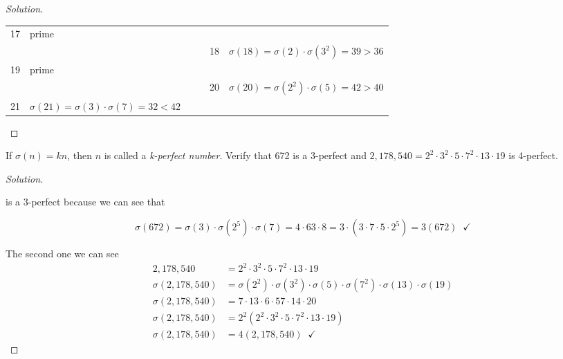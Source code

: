 \documentclass[11pt]{article}
\newenvironment{problem}[2][Problem]{\begin{trivlist}
\item[\hskip \labelsep {\bfseries #1}\hskip \labelsep {\bfseries #2.}]}{\end{trivlist}}
\newenvironment{solution}
  {\renewcommand\qedsymbol{$~$}\begin{proof}[Solution]$ $\par\nobreak\ignorespaces}
  {\end{proof}}
\begin{document}
\begin{solution}
{\begin{tabular}{l|l||l|l||l|l}
      17                                       & prime                                       &                                       &                                                &    &                                               \\
                                               & \                                           &                                       &                                                & 18 & $\sigma(18)=\sigma(2)\cdot \sigma(3^2)=39>36$ \\
      19                                       & prime                                       &                                       &                                                &    &                                               \\
                                               &                                             &                                       &                                                & 20 & $\sigma(20)=\sigma(2^2)\cdot \sigma(5)=42>40$ \\
      21                                       & $\sigma(21)=\sigma(3)\cdot \sigma(7)=32<42$ &                                       &                                                &    &                                               \\
    \end{tabular}}
\end{solution}


\begin{problem}{5}
If $\sigma(n)=kn$, then $n$ is called a \textit{k-perfect number}. Verify that 672 is a 3-perfect and $2,178,540=2^2\cdot 3^2\cdot 5\cdot 7^2\cdot 13\cdot 19$ is 4-perfect.
\end{problem}

\begin{solution}
  672 is a 3-perfect because we can see that

  \[
    \sigma(672)=\sigma(3) \cdot \sigma(2^5) \cdot \sigma(7)= 4 \cdot 63 \cdot 8 = 3 \cdot (3 \cdot 7 \cdot 5 \cdot 2^5) = 3(672) \;\; \checkmark
  \]

  The second one we can see
  \begin{align*}
    2,178,540         & =2^2\cdot 3^2\cdot 5\cdot 7^2\cdot 13\cdot 19                                                 \\
    \sigma(2,178,540) & =\sigma(2^2)\cdot \sigma(3^2)\cdot \sigma(5)\cdot \sigma(7^2)\cdot \sigma(13)\cdot \sigma(19) \\
    \sigma(2,178,540) & =7 \cdot 13 \cdot 6 \cdot 57 \cdot 14 \cdot 20                                                \\
    \sigma(2,178,540) & =2^2(2^2 \cdot 3^2\cdot 5 \cdot 7^2 \cdot 13 \cdot  19)                                       \\
    \sigma(2,178,540) & =4(2,178,540) \;\; \checkmark
  \end{align*}
\end{solution}
\end{document}
